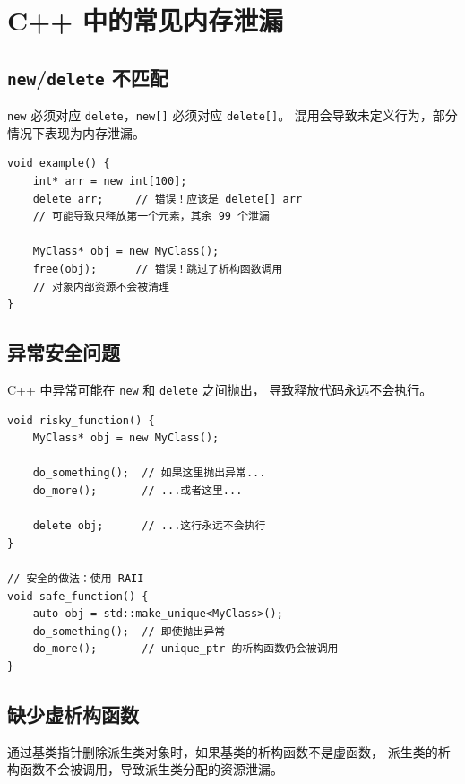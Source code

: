 \documentclass[12pt,a4paper,fontset=fandol]{ctexbook}
\begin{document}
\section{C++ 中的常见内存泄漏}

\subsection{\texttt{new}/\texttt{delete} 不匹配}

\texttt{new} 必须对应 \texttt{delete}，\texttt{new[]} 必须对应 \texttt{delete[]}。
混用会导致未定义行为，部分情况下表现为内存泄漏。

\begin{lstlisting}[style=cppstyle, caption={new/delete 不匹配}]
void example() {
    int* arr = new int[100];
    delete arr;     // 错误！应该是 delete[] arr
    // 可能导致只释放第一个元素，其余 99 个泄漏

    MyClass* obj = new MyClass();
    free(obj);      // 错误！跳过了析构函数调用
    // 对象内部资源不会被清理
}
\end{lstlisting}

\subsection{异常安全问题}

C++ 中异常可能在 \texttt{new} 和 \texttt{delete} 之间抛出，
导致释放代码永远不会执行。

\begin{lstlisting}[style=cppstyle, caption={异常导致的内存泄漏}]
void risky_function() {
    MyClass* obj = new MyClass();

    do_something();  // 如果这里抛出异常...
    do_more();       // ...或者这里...

    delete obj;      // ...这行永远不会执行
}

// 安全的做法：使用 RAII
void safe_function() {
    auto obj = std::make_unique<MyClass>();
    do_something();  // 即使抛出异常
    do_more();       // unique_ptr 的析构函数仍会被调用
}
\end{lstlisting}

\subsection{缺少虚析构函数}

通过基类指针删除派生类对象时，如果基类的析构函数不是虚函数，
派生类的析构函数不会被调用，导致派生类分配的资源泄漏。
\end{document}
